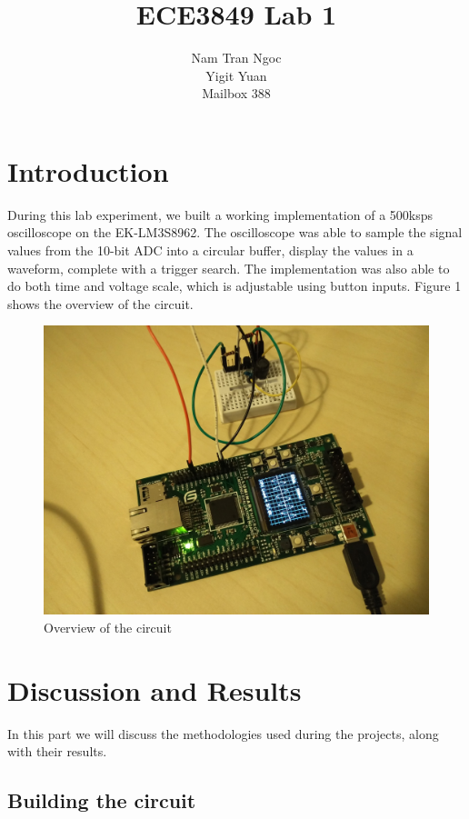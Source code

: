 \documentclass[12pt,oneside,letterpaper]{article}
\title{	ECE3849 Lab 1}
\author{Nam Tran Ngoc\\
		Yigit Yuan\\
    Mailbox 388}
\begin{document}
\maketitle
\cleardoublepage
\section{Introduction}
During this lab experiment, we built a working implementation of a 500ksps oscilloscope on the EK-LM3S8962. The oscilloscope was able to sample the signal values from the 10-bit ADC into a circular buffer, display the values in a waveform, complete with a trigger search. The implementation was also able to do both time and voltage scale, which is adjustable using button inputs. Figure 1 shows the overview of the circuit.

\begin{figure}[h]
  \includegraphics[width=\linewidth]{assets/overview.jpg}
  \caption{Overview of the circuit}
  \label{fig:overview}
\end{figure}

\section{Discussion and Results}
In this part we will discuss the methodologies used during the projects, along with their results.
\subsection{Building the circuit}
\end{document}
